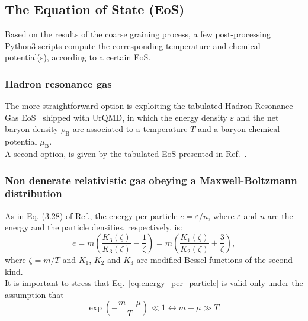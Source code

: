 \documentclass[12pt, a4paper]{article}
\begin{document}
\subsection{The Equation of State (EoS)}
Based on the results of the coarse graining process, a few post-processing Python3 scripts compute the corresponding temperature and chemical potential(s), according to a certain EoS.
\subsubsection{Hadron resonance gas}
The more straightforward option is exploiting the tabulated Hadron Resonance Gas EoS~\cite{Zschiesche:2002zr} shipped with UrQMD, in which the energy density $\varepsilon$ and the net baryon density $\rho_{\mathrm{B}}$ are associated to a temperature $T$ and a baryon chemical potential $\mu_{\mathrm{B}}$.\\
A second option, is given by the tabulated EoS presented in Ref.~\cite{Monnai:2019hkn}.
\subsubsection{Non denerate relativistic gas obeying a Maxwell-Boltzmann distribution}
As in Eq. (3.28) of Ref.{\cite{cercignani}}, the energy per particle $e=\varepsilon/n$, where $\varepsilon$ and $n$ are the energy and the particle densities, respectively, is:
\begin{equation}
e=m\left(\dfrac{K_3(\zeta)}{K_3(\zeta)}-\dfrac{1}{\zeta}\right)=m\left(\dfrac{K_1(\zeta)}{K_2(\zeta)}+\dfrac{3}{\zeta}\right),
\label{eq:energy_per_particle}
\end{equation}
where $\zeta=m/T$ and $K_1$, $K_2$ and $K_3$ are modified Bessel functions of the second kind.\\
It is important to stress that Eq.~\ref{eq:energy_per_particle} is valid only under the assumption that
\begin{equation}
	\exp\left(-\dfrac{m-\mu}{T}\right)\ll 1\leftrightarrow m-\mu \gg T.
	\label{eq:condition_en_per_part_formula}
\end{equation}
\end{document}
